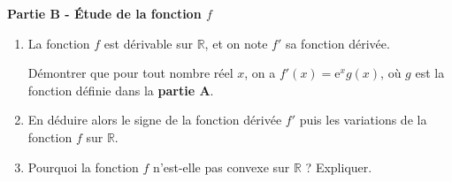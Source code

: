 \documentclass[10pt]{article}
\begin{document}
\medskip

\textbf{Partie B - Étude de la fonction \boldmath$f$\unboldmath}

\medskip

\begin{enumerate}
\item La fonction $f$ est dérivable sur $\mathbb{R}$, et on note $f'$ sa fonction dérivée.

Démontrer que pour tout nombre réel $x$, on a $f'(x)=\mathrm{e}^{x} g(x)$, où $g$ est la fonction définie dans la \textbf{partie A}.
\item En déduire alors le signe de la fonction dérivée $f'$ puis les variations de la fonction $f$ sur $\mathbb{R}$.
\item Pourquoi la fonction $f$ n'est-elle pas convexe sur $\mathbb{R}$ ? Expliquer.
\end{enumerate}

\bigskip
\end{document}
